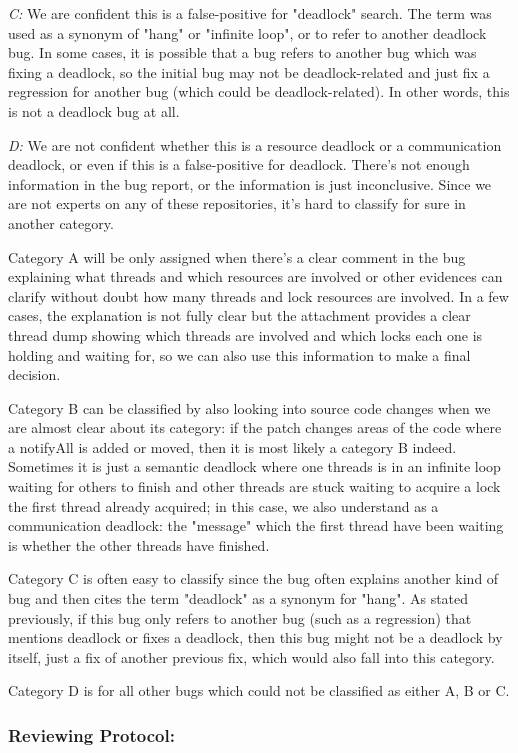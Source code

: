 \emph{C:} We are confident this is a false-positive for "deadlock" search. The term was used as a synonym of "hang" or "infinite loop", or to refer to another deadlock bug. In some cases, it is possible that a bug refers to another bug which was fixing a deadlock, so the initial bug may not be deadlock-related and just fix a regression for another bug (which could be deadlock-related). In other words, this is not a deadlock bug at all.

\emph{D:} We are not confident whether this is a resource deadlock or a communication deadlock, or even if this is a false-positive for deadlock. There's not enough information in the bug report, or the information is just inconclusive. Since we are not experts on any of these repositories, it's hard to classify for sure in another category.

Category A will be only assigned when there's a clear comment in the bug explaining what threads and which resources are involved or other evidences can clarify without doubt how many threads and lock resources are involved. In a few cases, the explanation is not fully clear but the attachment provides a clear thread dump showing which threads are involved and which locks each one is holding and waiting for, so we can also use this information to make a final decision.

Category B can be classified by also looking into source code changes when we are almost clear about its category: if the patch changes areas of the code where a notifyAll is added or moved, then it is most likely a category B indeed. Sometimes it is just a semantic deadlock where one threads is in an infinite loop waiting for others to finish and other threads are stuck waiting to acquire a lock the first thread already acquired; in this case, we also understand as a communication deadlock: the "message" which the first thread have been waiting is whether the other threads have finished.

Category C is often easy to classify since the bug often explains another kind of bug and then cites the term "deadlock" as a synonym for "hang". As stated previously, if this bug only refers to another bug (such as a regression) that mentions deadlock or fixes a deadlock, then this bug might not be a deadlock by itself, just a fix of another previous fix, which would also fall into this category.

Category D is for all other bugs which could not be classified as either A, B or C.

\subsubsection{Reviewing Protocol:} 

